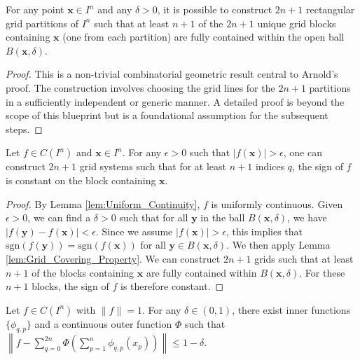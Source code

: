 \begin{lemma}
    \label{lem:Grid_Covering_Property}
    For any point $\mathbf{x} \in I^n$ and any $\delta > 0$, it is possible to construct $2n+1$ rectangular grid partitions of $I^n$ such that at least $n+1$ of the $2n+1$ unique grid blocks containing $\mathbf{x}$ (one from each partition) are fully contained within the open ball $B(\mathbf{x}, \delta)$.
\end{lemma}

\begin{proof}
    This is a non-trivial combinatorial geometric result central to Arnold's proof. The construction involves choosing the grid lines for the $2n+1$ partitions in a sufficiently independent or generic manner. A detailed proof is beyond the scope of this blueprint but is a foundational assumption for the subsequent steps.
\end{proof}

\begin{lemma}
    \label{lem:Grid_Sign_Agreement}
    Let $f \in C(I^n)$ and $\mathbf{x} \in I^n$. For any $\epsilon > 0$ such that $|f(\mathbf{x})| > \epsilon$, one can construct $2n+1$ grid systems such that for at least $n+1$ indices $q$, the sign of $f$ is constant on the block containing $\mathbf{x}$.
\end{lemma}

\begin{proof}
    By Lemma \ref{lem:Uniform_Continuity}, $f$ is uniformly continuous. Given $\epsilon > 0$, we can find a $\delta > 0$ such that for all $\mathbf{y}$ in the ball $B(\mathbf{x}, \delta)$, we have $|f(\mathbf{y}) - f(\mathbf{x})| < \epsilon$. Since we assume $|f(\mathbf{x})| > \epsilon$, this implies that $\text{sgn}(f(\mathbf{y})) = \text{sgn}(f(\mathbf{x}))$ for all $\mathbf{y} \in B(\mathbf{x}, \delta)$.
    We then apply Lemma \ref{lem:Grid_Covering_Property}. We can construct $2n+1$ grids such that at least $n+1$ of the blocks containing $\mathbf{x}$ are fully contained within $B(\mathbf{x}, \delta)$. For these $n+1$ blocks, the sign of $f$ is therefore constant.
\end{proof}

\begin{lemma}
    \label{lem:Single_Step_Approximation}
    Let $f \in C(I^n)$ with $\|f\|=1$. For any $\delta \in (0, 1)$, there exist inner functions $\{\phi_{q,p}\}$ and a continuous outer function $\Phi$ such that $\left\|f - \sum_{q=0}^{2n} \Phi\left(\sum_{p=1}^n \phi_{q,p}(x_p)\right)\right\| \le 1 - \delta$.
\end{lemma}

